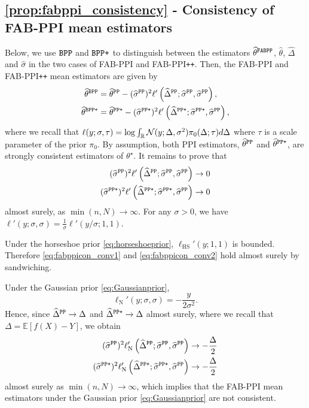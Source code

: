 \subsection{\cref{prop:fabppi_consistency} - Consistency of FAB-PPI mean estimators}
\label{app:prop:fabppi_consistency}
Below, we use $\mathrm{\texttt{BPP}}$ and $\mathrm{\texttt{BPP+}}$ to distinguish between the estimators $\widehat\theta^{\mathrm{\texttt{FABPP}}}$, $\widehat\theta$, $\widehat\Delta$ and $\widehat\sigma$ in the two cases of FAB-PPI and FAB-PPI\texttt{++}. Then, the FAB-PPI and FAB-PPI\texttt{++} mean estimators are given by
\begin{align*}
    \widehat \theta^{\mathrm{\texttt{BPP}}} &=  \widehat \theta^{\mathrm{\texttt{PP}}} - (\widehat\sigma^{\mathrm{\texttt{PP}}})^2 \ell'\left(\widehat\Delta^{\mathrm{\texttt{PP}}}; \widehat\sigma^{\mathrm{\texttt{PP}}}, \widehat\sigma^{\mathrm{\texttt{PP}}}\right),\\
    \widehat \theta^{\mathrm{\texttt{BPP+}}} &=  \widehat \theta^{\mathrm{\texttt{PP+}}} - (\widehat\sigma^{\mathrm{\texttt{PP+}}})^2 \ell'\left(\widehat\Delta^{\mathrm{\texttt{PP+}}};\widehat\sigma^{\mathrm{\texttt{PP+}}},\widehat\sigma^{\mathrm{\texttt{PP}}}\right),
\end{align*}
where we recall that $\ell(y;\sigma,\tau)=\log \int_\mathbb R \mathcal N(y;\Delta,\sigma^2)\pi_0(\Delta;\tau)d\Delta$ where $\tau$ is a scale parameter of the prior $\pi_0$. By assumption, both PPI estimators, $\widehat \theta^{\mathrm{\texttt{PP}}}$ and $\widehat \theta^{\mathrm{\texttt{PP+}}}$, are strongly consistent estimators of $\theta^\star$. It remains to prove that
\begin{align}
    (\widehat\sigma^{\mathrm{\texttt{PP}}})^2 \ell'\left(\widehat\Delta^{\mathrm{\texttt{PP}}};\widehat\sigma^{\mathrm{\texttt{PP}}}, \widehat\sigma^{\mathrm{\texttt{PP}}} \right)\to 0\label{eq:fabppicon_conv1}\\
    (\widehat\sigma^{\mathrm{\texttt{PP+}}})^2 \ell'\left(\widehat\Delta^{\mathrm{\texttt{PP+}}};\widehat\sigma^{\mathrm{\texttt{PP+}}}, \widehat\sigma^{\mathrm{\texttt{PP}}} \right)\to 0\label{eq:fabppicon_conv2}
\end{align}
almost surely, as $\min(n,N)\to\infty$. For any $\sigma>0$, we have $\ell'(y;\sigma,\sigma)=\frac{1}{\sigma}\ell'(y/\sigma; 1,1)$.

Under the horseshoe prior \eqref{eq:horseshoeprior}, $\ell_{\text{HS}}'(y; 1,1)$ is bounded.  Therefore \eqref{eq:fabppicon_conv1} and \eqref{eq:fabppicon_conv2} hold almost surely by sandwiching.

Under the Gaussian prior \eqref{eq:Gaussianprior},
$$
    \ell_{\text{N}}'(y;\sigma,\sigma)=-\frac{y}{2\sigma^2}.
$$
Hence, since $\widehat\Delta^{\mathrm{\texttt{PP}}}\to \Delta$ and $\widehat\Delta^{\mathrm{\texttt{PP+}}}\to \Delta$ almost surely, where we recall that $\Delta=\mathbb E[f(X)-Y]$, we obtain
\begin{align*}
    (\widehat\sigma^{\mathrm{\texttt{PP}}})^2 \ell_{\text{N}}'\left(\widehat\Delta^{\mathrm{\texttt{PP}}}; \widehat\sigma^{\mathrm{\texttt{PP}}},\widehat\sigma^{\mathrm{\texttt{PP}}}\right)\to -\frac{\Delta}{2}\\
    (\widehat\sigma^{\mathrm{\texttt{PP+}}})^2 \ell_{\text{N}}'\left(\widehat\Delta^{\mathrm{\texttt{PP+}}}; \widehat\sigma^{\mathrm{\texttt{PP+}}},\widehat\sigma^{\mathrm{\texttt{PP}}}\right)\to -\frac{\Delta}{2}
\end{align*}
almost surely as $\min(n,N)\to\infty$, which implies that the FAB-PPI mean estimators under the Gaussian prior \eqref{eq:Gaussianprior} are not consistent.
